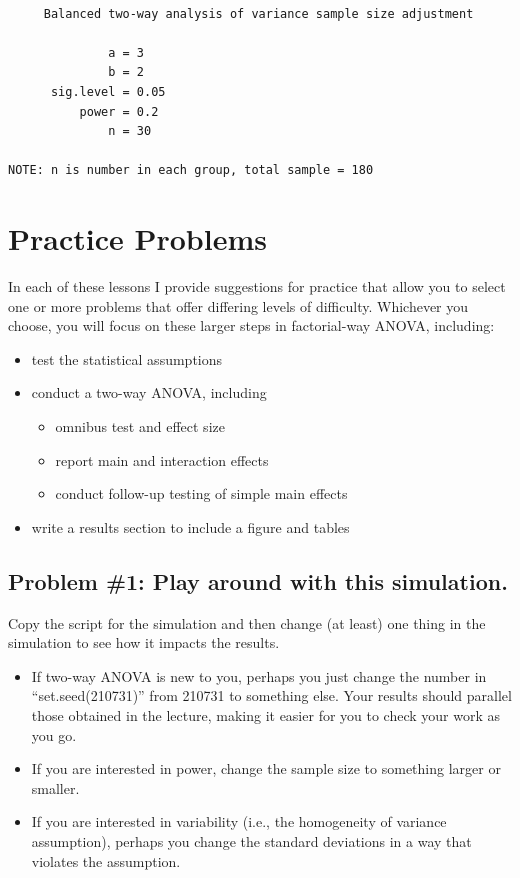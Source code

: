 \documentclass[
  11pt,
]{book}
\providecommand{\tightlist}{%
  \setlength{\itemsep}{0pt}\setlength{\parskip}{0pt}}
\begin{document}
\begin{verbatim}

     Balanced two-way analysis of variance sample size adjustment 

              a = 3
              b = 2
      sig.level = 0.05
          power = 0.2
              n = 30

NOTE: n is number in each group, total sample = 180
\end{verbatim}

\hypertarget{practice-problems-5}{%
\section{Practice Problems}\label{practice-problems-5}}

In each of these lessons I provide suggestions for practice that allow you to select one or more problems that offer differing levels of difficulty. Whichever you choose, you will focus on these larger steps in factorial-way ANOVA, including:

\begin{itemize}
\tightlist
\item
  test the statistical assumptions
\item
  conduct a two-way ANOVA, including

  \begin{itemize}
  \tightlist
  \item
    omnibus test and effect size
  \item
    report main and interaction effects
  \item
    conduct follow-up testing of simple main effects
  \end{itemize}
\item
  write a results section to include a figure and tables
\end{itemize}

\hypertarget{problem-1-play-around-with-this-simulation.-1}{%
\subsection{Problem \#1: Play around with this simulation.}\label{problem-1-play-around-with-this-simulation.-1}}

Copy the script for the simulation and then change (at least) one thing in the simulation to see how it impacts the results.

\begin{itemize}
\tightlist
\item
  If two-way ANOVA is new to you, perhaps you just change the number in ``set.seed(210731)'' from 210731 to something else. Your results should parallel those obtained in the lecture, making it easier for you to check your work as you go.
\item
  If you are interested in power, change the sample size to something larger or smaller.
\item
  If you are interested in variability (i.e., the homogeneity of variance assumption), perhaps you change the standard deviations in a way that violates the assumption.
\end{itemize}
\end{document}
